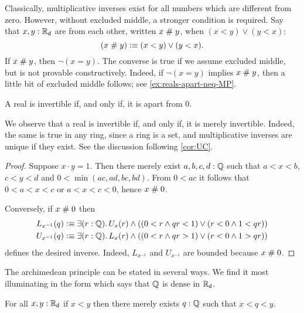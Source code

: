 Classically, multiplicative inverses exist for all numbers which are different from zero.
However, without excluded middle, a stronger condition is required. Say that $x, y : \mathbb{R}_\mathsf{d}$
are  from each other, written $x \mathrel{\#} y$, when $(x < y) \lor (y < x)$:
%
\begin{equation*}
  (x \mathrel{\#} y) \vcentcolon\equiv (x < y) \lor (y < x).
\end{equation*}
%
If $x \mathrel{\#} y$, then $\lnot (x = y)$.
The converse is true if we assume excluded middle, but is not provable constructively.
Indeed, if $\lnot (x = y)$ implies $x\mathrel{\#} y$, then a little bit of excluded middle follows; see \autoref{ex:reals-apart-neq-MP}.

\begin{thm} \label{RD-inverse-apart-0}
  A real is invertible if, and only if, it is apart from $0$.
\end{thm}

\begin{rmk}
  We observe that a real is invertible if, and only if, it is merely
  invertible.  Indeed, the same is true in any ring, since a ring is a set, and
  multiplicative inverses are unique if they exist.  See the discussion
  following \autoref{cor:UC}.
\end{rmk}

\begin{proof}
  Suppose $x \cdot y = 1$. Then there merely exist $a, b, c, d : \mathbb{Q}$ such that
  $a < x < b$, $c < y < d$ and $0 < \min (a c, a d, b c, b d)$. From $0 < a c$ it follows
  that $0 < a < x < c$ or $a < x < c < 0$, hence $x \mathrel{\#} 0$.

  Conversely, if $x \mathrel{\#} 0$ then
  \begin{align*}
    L_{x^{-1}}(q) &\defeq
    \exis{r : \Q} U_x(r) \land ((0 < r \land q r < 1) \lor (r < 0 \land 1 < q r))
    \\
    U_{x^{-1}}(q) &\defeq
    \exis{r : \Q} L_x(r) \land ((0 < r \land q r > 1) \lor (r < 0 \land 1 > q r))
  \end{align*}
  defines the desired inverse. Indeed, $L_{x^{-1}}$ and $U_{x^{-1}}$ are bounded because
  $x \mathrel{\#} 0$.
\end{proof}

The archimedean principle can be stated in several ways. We find it most illuminating in the
form which says that $\mathbb{Q}$ is dense in $\mathbb{R}_\mathsf{d}$.

\begin{thm} \label{RD-archimedean}
  For all $x, y : \mathbb{R}_\mathsf{d}$ if $x < y$ then there merely exists $q : \mathbb{Q}$ such that
  $x < q < y$.
\end{thm}

